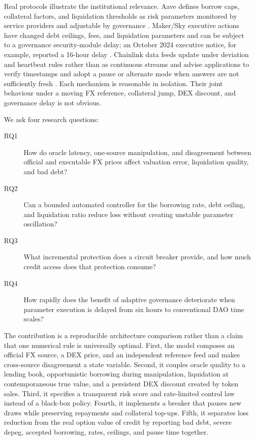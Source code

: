 \documentclass[sn-vancouver,Numbered]{sn-jnl}
\begin{document}
Real protocols illustrate the institutional relevance. Aave defines borrow caps, collateral factors, and liquidation thresholds as risk parameters monitored by service providers and adjustable by governance \cite{AaveReserve,AaveRisk}. Maker/Sky executive actions have changed debt ceilings, fees, and liquidation parameters and can be subject to a governance security-module delay; an October 2024 executive notice, for example, reported a 16-hour delay \cite{MakerVote2024}. Chainlink data feeds update under deviation and heartbeat rules rather than as continuous streams and advise applications to verify timestamps and adopt a pause or alternate mode when answers are not sufficiently fresh \cite{ChainlinkFeeds}. Each mechanism is reasonable in isolation. Their joint behaviour under a moving FX reference, collateral jump, DEX discount, and governance delay is not obvious.

We ask four research questions:

\begin{description}
  \item[RQ1] How do oracle latency, one-source manipulation, and disagreement between official and executable FX prices affect valuation error, liquidation quality, and bad debt?
  \item[RQ2] Can a bounded automated controller for the borrowing rate, debt ceiling, and liquidation ratio reduce loss without creating unstable parameter oscillation?
  \item[RQ3] What incremental protection does a circuit breaker provide, and how much credit access does that protection consume?
  \item[RQ4] How rapidly does the benefit of adaptive governance deteriorate when parameter execution is delayed from six hours to conventional DAO time scales?
\end{description}

The contribution is a reproducible architecture comparison rather than a claim that one numerical rule is universally optimal. First, the model composes an official FX source, a DEX price, and an independent reference feed and makes cross-source disagreement a state variable. Second, it couples oracle quality to a lending book, opportunistic borrowing during manipulation, liquidation at contemporaneous true value, and a persistent DEX discount created by token sales. Third, it specifies a transparent risk score and rate-limited control law instead of a black-box policy. Fourth, it implements a breaker that pauses new draws while preserving repayments and collateral top-ups. Fifth, it separates loss reduction from the real option value of credit by reporting bad debt, severe depeg, accepted borrowing, rates, ceilings, and pause time together.
\end{document}

